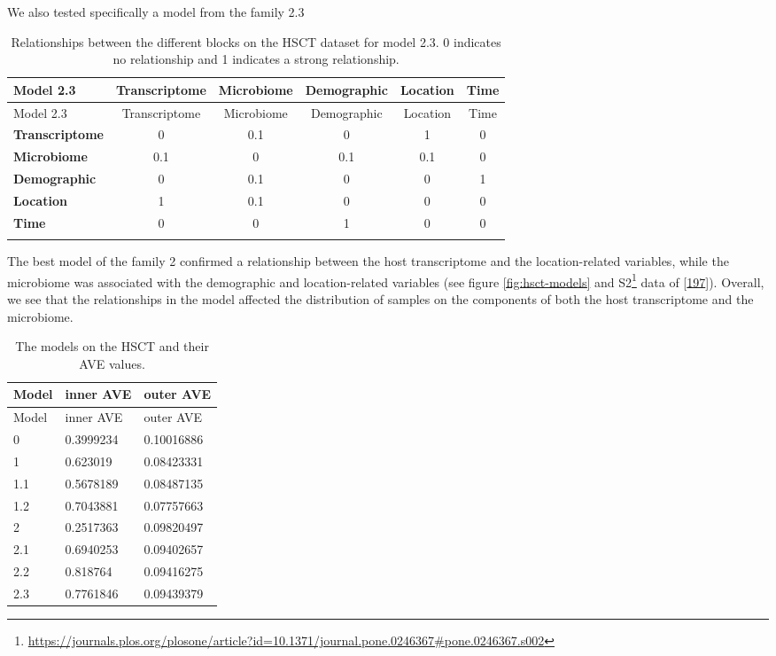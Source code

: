 \documentclass[
  a4paper,
]{book}
\DeclareRobustCommand{\href}[2]{#2\footnote{\url{#1}}}
\begin{document}
We also tested specifically a model from the family 2.3

\begin{longtable}[]{@{}lccccc@{}}
\caption{\label{tab:hsct-model2-3} Relationships between the different blocks on the HSCT dataset for model 2.3. 0 indicates no relationship and 1 indicates a strong relationship.}\tabularnewline
\toprule
Model 2.3 & Transcriptome & Microbiome & Demographic & Location & Time \\
\midrule
\endfirsthead
\toprule
Model 2.3 & Transcriptome & Microbiome & Demographic & Location & Time \\
\midrule
\endhead
\textbf{Transcriptome} & 0 & 0.1 & 0 & 1 & 0 \\
\textbf{Microbiome} & 0.1 & 0 & 0.1 & 0.1 & 0 \\
\textbf{Demographic} & 0 & 0.1 & 0 & 0 & 1 \\
\textbf{Location} & 1 & 0.1 & 0 & 0 & 0 \\
\textbf{Time} & 0 & 0 & 1 & 0 & 0 \\
& & & & & \\
\bottomrule
\end{longtable}

The best model of the family 2 confirmed a relationship between the host transcriptome and the location-related variables, while the microbiome was associated with the demographic and location-related variables (see figure \ref{fig:hsct-models} and \href{https://journals.plos.org/plosone/article?id=10.1371/journal.pone.0246367\#pone.0246367.s002}{S2} data of {[}\protect\hyperlink{ref-revilla2021}{197}{]}).
Overall, we see that the relationships in the model affected the distribution of samples on the components of both the host transcriptome and the microbiome.

\begin{longtable}[]{@{}lll@{}}
\caption{\label{tab:hsct-models-ave} The models on the HSCT and their AVE values.}\tabularnewline
\toprule
Model & inner AVE & outer AVE \\
\midrule
\endfirsthead
\toprule
Model & inner AVE & outer AVE \\
\midrule
\endhead
0 & 0.3999234 & 0.10016886 \\
1 & 0.623019 & 0.08423331 \\
1.1 & 0.5678189 & 0.08487135 \\
1.2 & 0.7043881 & 0.07757663 \\
2 & 0.2517363 & 0.09820497 \\
2.1 & 0.6940253 & 0.09402657 \\
2.2 & 0.818764 & 0.09416275 \\
2.3 & 0.7761846 & 0.09439379 \\
\bottomrule
\end{longtable}
\end{document}
